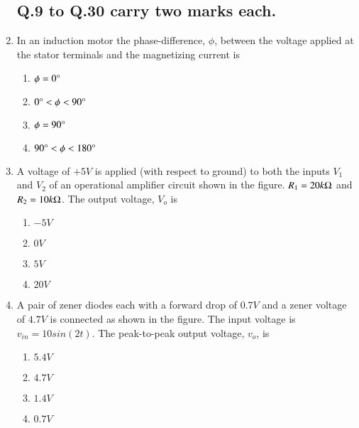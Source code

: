 \documentclass[journal]{IEEEtran}
\begin{document}
\begin{enumerate}

\subsection*{Q.9 to Q.30 carry two marks each.}

    \item In an induction motor the phase-difference, $\phi$, between the voltage applied at the stator terminals and the magnetizing current is
        \begin{enumerate}
            \item $\phi=0\degree$
            \item $0\degree<\phi<90\degree$
            \item $\phi=90\degree$
            \item $90\degree<\phi<180\degree$
        \end{enumerate}
    
    \item A voltage of $+5V$ is applied (with respect to ground) to both the inputs $V_1$ and $V_2$ of an operational amplifier circuit shown in the figure. $R_1=20k\ohm$ and $R_2=10k\ohm$. The output voltage, $V_o$ is
        \begin{figure}[!ht]
            \centering
            
        \end{figure}
        \begin{enumerate}
            \item $-5V$
            \item $0V$
            \item $5V$
            \item $20V$
        \end{enumerate}
    
    \item A pair of zener diodes each with a forward drop of $0.7V$ and a zener voltage of $4.7V$ is connected as shown in the figure. The input voltage is $v_{in}=10sin(2t)$. The peak-to-peak output voltage, $v_o$, is
        \begin{figure}[!ht]
            \centering
            
        \end{figure}
        \begin{enumerate}
            \item $5.4V$
            \item $4.7V$
            \item $1.4V$
            \item $0.7V$
        \end{enumerate}


\end{enumerate}
\end{document}
